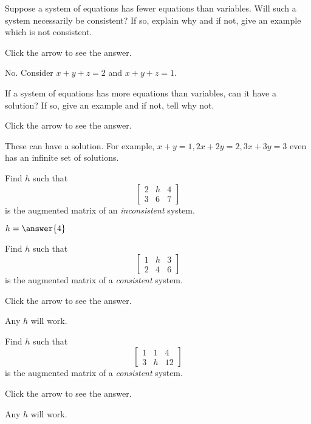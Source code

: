 \documentclass{ximera}
\begin{document}
\begin{problem}\label{prb:2.8}
Suppose a system of equations has fewer equations than variables. Will such a system necessarily be consistent? If so, explain why and if not, give an example which is not consistent.

Click the arrow to see the answer.
\begin{expandable}
No. Consider $x+y+z=2$ and $x+y+z=1.$
\end{expandable}
\end{problem}

\begin{problem}\label{prb:2.9}
If a system of equations has more equations than variables, can it
have a solution? If so, give an example and if not, tell why not.

Click the arrow to see the answer. 
\begin{expandable}
These can
have a solution. For example, $x+y=1,2x+2y=2,3x+3y=3$ even has an infinite
set of solutions.
\end{expandable}
\end{problem}

\begin{problem}\label{prb:2.10}
Find $h$ such that
\begin{equation*}
\left[
\begin{array}{rr|r}
2 & h & 4 \\
3 & 6 & 7
\end{array}
\right]
\end{equation*}
is the augmented matrix of an \textit{inconsistent} system.

$h=\answer{4}$

\end{problem}

\begin{problem}\label{prb:2.11}
Find $h$ such that
\begin{equation*}
\left[
\begin{array}{rr|r}
1 & h & 3 \\
2 & 4 & 6
\end{array}
\right]
\end{equation*}
is the augmented matrix of a \textit{consistent} system.

Click the arrow to see the answer. 
\begin{expandable}
 Any $h$ will work.
\end{expandable}
\end{problem}

\begin{problem}\label{prb:2.12}
Find $h$ such that
\begin{equation*}
\left[
\begin{array}{rr|r}
1 & 1 & 4 \\
3 & h & 12
\end{array}
\right]
\end{equation*}
is the augmented matrix of a \textit{consistent} system.

Click the arrow to see the answer. 
\begin{expandable}
 Any $h$ will work.
\end{expandable}
\end{problem}
\end{document}
